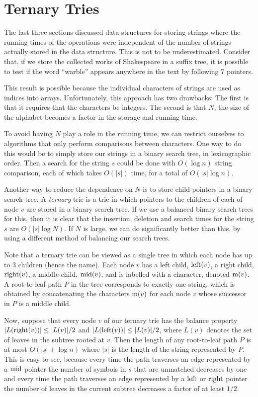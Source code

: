 \section{Ternary Tries}

The last three sections discussed data structures for storing strings
where the running times of the operations were independent of the
number of strings actually stored in the data structure.  This is not
to be underestimated.  Consider that, if we store the collected works
of Shakespeare in a suffix tree, it is possible to test if the word
``warble'' appears anywhere in the text by following 7 pointers.

This result is possible because the individual characters of strings
are used as indices into arrays.  Unfortunately, this approach has
two drawbacks: The first is that it requires that the characters be
integers.  The second is that $N$, the size of the alphabet becomes a
factor in the storage and running time.

To avoid having $N$ play a role in the running time, we can restrict
ourselves to algorithms that only perform comparisons between
characters.  One way to do this would be to simply store our strings
in a binary search tree, in lexicographic order.  Then a search for
the string $s$ could be done with $O(\log n)$ string comparison, each
of which takes $O(|s|)$ time, for a total of $O(|s|\log n)$.

Another way to reduce the dependence on $N$ is to store child pointers
in a binary search tree.  A \emph{ternary} trie is a trie in which
pointers to the children of each of node $v$ are stored in a binary
search tree.  If we use a balanced binary search trees for this, then it
is clear that the insertion, deletion and search times for the string
$s$ are $O(|s|\log N)$.  If $N$ is large, we can do significantly
better than this, by using a different method of balancing our search
trees.

Note that a ternary trie can be viewed as a single tree in which each
node has up to 3 children (hence the name).  Each node $v$ has a left
child, $\mathrm{left}(v)$, a right child, $\mathrm{right}(v)$, a middle child, $\mathrm{mid}(v)$,
and is labelled with a character, denoted $\mathrm{m}(v)$.  A root-to-leaf path
$P$ in the tree corresponds to exactly one string, which is obtained by
concatenating the characters $\mathrm{m}(v)$ for each node $v$ whose successor
in $P$ is a middle child.

Now, suppose that every node $v$ of our ternary trie has the balance
property $|L(\mathrm{right}(v))|\le |L(v)|/2$ and $|L(\mathrm{left}(v))|\le |L(v)|/2$,
where $L(v)$ denotes the set of leaves in the subtree rooted at $v$.
Then the length of any root-to-leaf path $P$ is at most $O(|s|+\log
n)$ where $|s|$ is the length of the string represented by $P$.  This
is easy to see, because every time the path traverses an edge
represented by a $\mathrm{mid}$ pointer the number of symbols in $s$ that are
unmatched decreases by one and every time the path traverses an edge
represented by a $\mathrm{left}$ or $\mathrm{right}$ pointer the number of leaves in the
current subtree decreases a factor of at least $1/2$.

